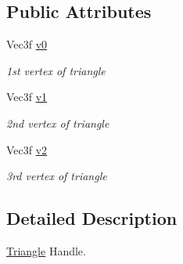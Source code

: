 \subsection*{Public Attributes}
\begin{DoxyCompactItemize}
\item 
\hypertarget{classembree_1_1_triangle_handle_a35c8691e6fd5990f74a094aca8238bc2}{
Vec3f \hyperlink{classembree_1_1_triangle_handle_a35c8691e6fd5990f74a094aca8238bc2}{v0}}
\label{classembree_1_1_triangle_handle_a35c8691e6fd5990f74a094aca8238bc2}

\begin{DoxyCompactList}\small\item\em 1st vertex of triangle \item\end{DoxyCompactList}\item 
\hypertarget{classembree_1_1_triangle_handle_a9f693e0caa4029c27a4a8ed944f095f6}{
Vec3f \hyperlink{classembree_1_1_triangle_handle_a9f693e0caa4029c27a4a8ed944f095f6}{v1}}
\label{classembree_1_1_triangle_handle_a9f693e0caa4029c27a4a8ed944f095f6}

\begin{DoxyCompactList}\small\item\em 2nd vertex of triangle \item\end{DoxyCompactList}\item 
\hypertarget{classembree_1_1_triangle_handle_a6b9675ab3527383d84f41a7484d61925}{
Vec3f \hyperlink{classembree_1_1_triangle_handle_a6b9675ab3527383d84f41a7484d61925}{v2}}
\label{classembree_1_1_triangle_handle_a6b9675ab3527383d84f41a7484d61925}

\begin{DoxyCompactList}\small\item\em 3rd vertex of triangle \item\end{DoxyCompactList}\end{DoxyCompactItemize}


\subsection{Detailed Description}
\hyperlink{classembree_1_1_triangle}{Triangle} Handle. 


